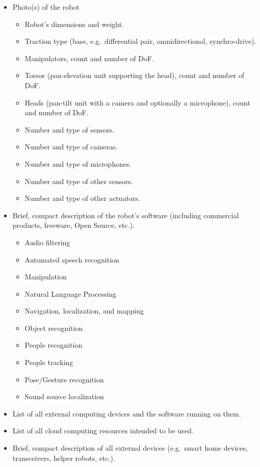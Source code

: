 \documentclass[12pt]{article}
\begin{document}
\begin{itemize}[nosep]
	\item Photo(s) of the robot
	\begin{itemize}[nosep]
		\item Robot's dimensions and weight.
		\item Traction type (base, e.g.~differential pair, omnidirectional, synchro-drive).
		\item Manipulators, count and number of DoF.
		\item Torsos (pan-elevation unit supporting the head), count and number of DoF.
		\item Heads (pan-tilt unit with a camera and optionally a microphone), count and number of DoF.
		\item Number and type of sensors.
		\item Number and type of cameras.
		\item Number and type of microphones.
		\item Number and type of other sensors.
		\item Number and type of other actuators.
	\end{itemize}
	\item Brief, compact description of the robot's software (including commercial products, freeware, Open Source, etc.).
	\begin{itemize}[nosep]
		\item Audio filtering
		\item Automated speech recognition
		\item Manipulation
		\item Natural Language Processing
		\item Navigation, localization, and mapping
		\item Object recognition
		\item People recognition
		\item People tracking
		\item Pose/Gesture recognition
		\item Sound source localization
	\end{itemize}
	\item List of all external computing devices and the software running on them.
	\item List of all cloud computing resources intended to be used.
	\item Brief, compact description of all external devices (e.g.~smart home devices, transceivers, helper robots, etc.).
\end{itemize}
\end{document}
